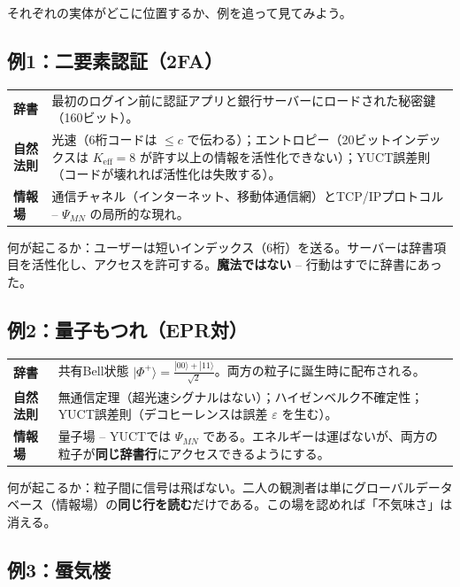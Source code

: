 \documentclass[12pt,a4paper]{article}
\begin{document}
	それぞれの実体がどこに位置するか、例を追って見てみよう。
	
	\subsection{例1：二要素認証（2FA）}
	
	\begin{tabular}{p{2.8cm} p{10cm}}
		\textbf{辞書} & 最初のログイン前に認証アプリと銀行サーバーにロードされた秘密鍵（160ビット）。 \\
		\textbf{自然法則} & 光速（6桁コードは \(\le c\) で伝わる）；エントロピー（20ビットインデックスは \(K_{\mathrm{eff}}=8\) が許す以上の情報を活性化できない）；YUCT誤差則（コードが壊れれば活性化は失敗する）。 \\
		\textbf{情報場} & 通信チャネル（インターネット、移動体通信網）とTCP/IPプロトコル -- \(\Psi_{MN}\) の局所的な現れ。 \\
	\end{tabular}
	
	\noindent 何が起こるか：ユーザーは短いインデックス（6桁）を送る。サーバーは辞書項目を活性化し、アクセスを許可する。\textbf{魔法ではない} -- 行動はすでに辞書にあった。
	
	\subsection{例2：量子もつれ（EPR対）}
	
	\begin{tabular}{p{2.8cm} p{10cm}}
		\textbf{辞書} & 共有Bell状態 \(|\Phi^+\rangle = \frac{|00\rangle + |11\rangle}{\sqrt{2}}\)。両方の粒子に誕生時に配布される。 \\
		\textbf{自然法則} & 無通信定理（超光速シグナルはない）；ハイゼンベルク不確定性；YUCT誤差則（デコヒーレンスは誤差 \(\varepsilon\) を生む）。 \\
		\textbf{情報場} & 量子場 -- YUCTでは \(\Psi_{MN}\) である。エネルギーは運ばないが、両方の粒子が\textbf{同じ辞書行}にアクセスできるようにする。 \\
	\end{tabular}
	
	\noindent 何が起こるか：粒子間に信号は飛ばない。二人の観測者は単にグローバルデータベース（情報場）の\textbf{同じ行を読む}だけである。この場を認めれば「不気味さ」は消える。
	
	\subsection{例3：蜃気楼}
	
\end{document}

